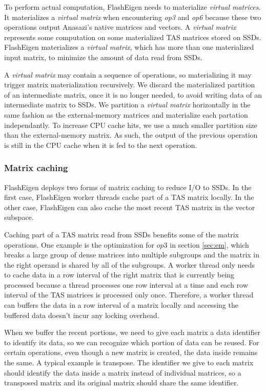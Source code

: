 To perform actual computation, FlashEigen needs to materialize
\textit{virtual matrices}. It materializes a \textit{virtual matrix} when
encountering \textit{op3} and \textit{op6} because these two operations
output Anasazi's native matrices and vectors.
A \textit{virtual matrix} represents some computation on some materialized
TAS matrices stored on SSDs. FlashEigen materializes
a \textit{virtual matrix}, which has more than one materialized input matrix,
to minimize the amount of data read from SSDs.

A \textit{virtual matrix} may contain a sequence of operations, so materializing
it may trigger matrix materialization recursively. We discard the materialized
partition of an intermediate matrix, once it is no longer needed, to avoid
writing data of an intermediate matrix to SSDs.
We partition a \textit{virtual matrix} horizontally in the same fashion as
the external-memory matrices and materialize each partation independantly. 
To increase CPU cache hits, we use a much smaller partition size than
the external-memory matrix. As such, the output of the previous operation is
still in the CPU cache when it is fed to the next operation.

\subsubsection{Matrix caching}
FlashEigen deploys two forms of matrix caching to reduce I/O to SSDs.
In the first case, FlashEigen worker threads cache part of a TAS
matrix locally. In the other case, FlashEigen can also cache the most recent
TAS matrix in the vector subspace.

Caching part of a TAS matrix read from SSDs benefits some of
the matrix operations. One example is the optimization for $op3$ in section
\ref{sec:em}, which breaks a large group of dense matrices into multiple
subgroups and the matrix in the right operand is shared by all of the subgroups.
A worker thread only needs to cache data in a row interval of the right matrix
that is currently being processed because a thread processes one row interval
at a time and each row interval of the TAS matrices is processed only once.
Therefore, a worker thread can buffers the data in a row interval of a matrix
locally and accessing the buffered data doesn't incur any locking overhead.

When we buffer the recent portions, we need to give each matrix a data identifier
to identify its data, so we can recognize which portion of data can be reused.
For certain operations, even though a new matrix is created, the data inside
remains the same. A typical example is transpose. The identifier we give to
each matrix should identify the data inside a matrix instead of individual matrices,
so a transposed matrix and its original matrix should share the same identifier.

